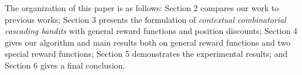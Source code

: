 \documentclass{article}
\newcommand{\wei}[1]{}
\newcommand{\wei}[1]{{\color{blue!50!black}  [\text{Wei:} #1]}}
\begin{document}




The organization of this paper is as follows: Section 2 compares our work to previous works; Section 3 presents the formulation of {\it contextual combinatorial cascading bandits} with general reward functions and position discounts; Section 4 gives our algorithm and main results both on general reward functions and two special reward functions; Section 5 demonstrates the experimental results; and Section 6 gives a final conclusion.

\end{document}
